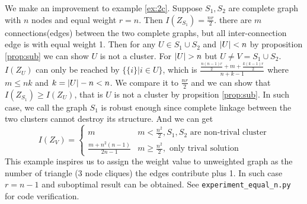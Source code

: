 \documentclass{article}
\begin{document}
\begin{example}\label{ex:2nc}
We make an improvement to example \ref{ex:2c}.
Suppose $S_1, S_2 $ are complete graph with $n$ nodes and equal weight $r=n$. Then $I(Z_{S_1})= \frac{nr}{2}$. there are $m$ connections(edges) between the two complete graphs, but all inter-connection edge is with equal weight 1. Then for any $U \in S_1 \cup S_2 $ and $\lvert U\rvert < n$ by proposition \ref{prop:sub} we can show $U$ is not a cluster.
For $\lvert U\rvert > n$ but $U \neq V = S_1 \cup S_2$. $I(Z_U)$ can only be reached by $\{\{i\}| i\in U\}$, which is $\frac{\frac{n(n-1)r}{2} + m + \frac{k(k-1)r}{2}}{n+k-1}$ where $m \leq nk$ and $k=\lvert U\rvert - n < n$. We compare it to $\frac{nr}{2}$ and we can show that $I(Z_{S_1}) \geq I(Z_U) $, that is $U$ is not a cluster by propsition \ref{prop:sub}. 
In such case, we call the graph $S_1$ is robust enough since complete linkage between the two clusters cannot destroy its structure. And we can get
\begin{equation*}
I(Z_V) = \begin{cases}
m & m <\frac{n^2}{2}, S_1,S_2 \textrm{ are non-trival cluster} \\
\frac{m+n^2(n-1)}{2n-1} & m\geq \frac{n^2}{2}, \textrm{ only trival solution} 
\end{cases}
\end{equation*}
This example inspires us to assign the weight value to unweighted graph as the number of triangle (3 node cliques) the edges contribute plus 1. In such case $ r = n-1$ and suboptimal result can be obtained. See \texttt{experiment\_equal\_n.py} for code verification.
\end{example}
\end{document}
